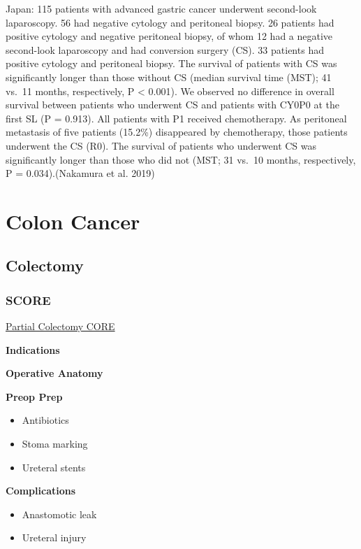 \documentclass[
  letterpaper,
]{scrbook}
\providecommand{\tightlist}{%
  \setlength{\itemsep}{0pt}\setlength{\parskip}{0pt}}
\begin{document}
Japan: 115 patients with advanced gastric cancer underwent second-look
laparoscopy. 56 had negative cytology and peritoneal biopsy. 26 patients
had positive cytology and negative peritoneal biopsy, of whom 12 had a
negative second-look laparoscopy and had conversion surgery (CS). 33
patients had positive cytology and peritoneal biopsy. The survival of
patients with CS was significantly longer than those without CS (median
survival time (MST); 41 vs.~11 months, respectively, P \textless{}
0.001). We observed no difference in overall survival between patients
who underwent CS and patients with CY0P0 at the first SL (P = 0.913).
All patients with P1 received chemotherapy. As peritoneal metastasis of
five patients (15.2\%) disappeared by chemotherapy, those patients
underwent the CS (R0). The survival of patients who underwent CS was
significantly longer than those who did not (MST; 31 vs.~10 months,
respectively, P = 0.034).(Nakamura et al. 2019)

\part{Colon Cancer}

\chapter{Colectomy}\label{colectomy}

\section{SCORE}\label{PColectomyObj}

\href{https://www.surgicalcore.org/modulecontent.aspx?id=129670}{Partial
Colectomy CORE}

\textbf{Indications}

\textbf{Operative Anatomy}

\textbf{Preop Prep}

\begin{itemize}
\tightlist
\item
  Antibiotics
\item
  Stoma marking
\item
  Ureteral stents
\end{itemize}

\textbf{Complications}

\begin{itemize}
\tightlist
\item
  Anastomotic leak
\item
  Ureteral injury
\end{itemize}
\end{document}
